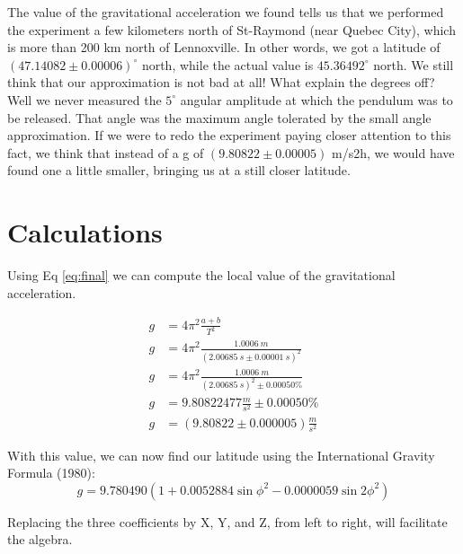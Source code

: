 \documentclass[12pt]{article}
\begin{document}
The value of the gravitational acceleration we found tells us that we performed the experiment a few kilometers north of St-Raymond (near Quebec City), which is more than 200 km north of Lennoxville. In other words, we got a latitude of $(47.14082 \pm 0.00006)^\circ$ north, while the actual value is $45.36492^\circ$ north. We still think that our approximation is not bad at all! What explain the degrees off? Well we never measured the $5^\circ$ angular amplitude at which the pendulum was to be released. That angle was the maximum angle tolerated by the small angle approximation. If we were to redo the experiment paying closer attention to this fact, we think that instead of a g of  $(9.80822 \pm 0.00005)$ \si{m/s2h}, we would have found one a little smaller, bringing us at a still closer latitude. 
\newpage
\section*{Calculations}
Using Eq \eqref{eq:final} we can compute the local value of the gravitational acceleration.

\begin{equation}
    \begin{aligned}
        g&=4\pi^2\frac{ a+b }{ T^2 } \\ 
        g&=4\pi^2\frac{1.0006\ \si{m} }{(2.00685\ \si{s} \pm 0.00001\ \si{s})^2} \\ 
        g&=4\pi^2\frac{1.0006\  \si{m} }{(2.00685\ \si{s})^2 \pm 0.00050\% } \\ 
        g&= 9.80822477\frac{\si{m}}{\si{s^2}} \pm 0.00050\% \\
        g&= (9.80822 \pm 0.000005)\frac{\si{m}}{\si{s^2}}
    \end{aligned}
\end{equation}

With this value, we can now find our latitude using the International Gravity Formula (1980):
\begin{equation*}
        g=9.780490(1 + 0.0052884\sin{\phi}^2 - 0.0000059\sin{2\phi}^2)
\end{equation*}

Replacing the three coefficients by X, Y, and Z, from left to right, will facilitate the algebra.
\end{document}
